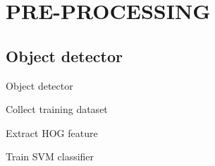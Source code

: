 \documentclass[xcolor=table,compress,blue]{beamer}
\begin{document}
\section{PRE-PROCESSING}
\subsection{Object detector}
\begin{frame}{Object detector}
	\begin{exampleblock}{Collect training dataset}

	\end{exampleblock}
	\begin{exampleblock}{Extract HOG feature}

	\end{exampleblock}
	\begin{exampleblock}{Train SVM classifier}

	\end{exampleblock}
\end{frame}
 
\end{document}
